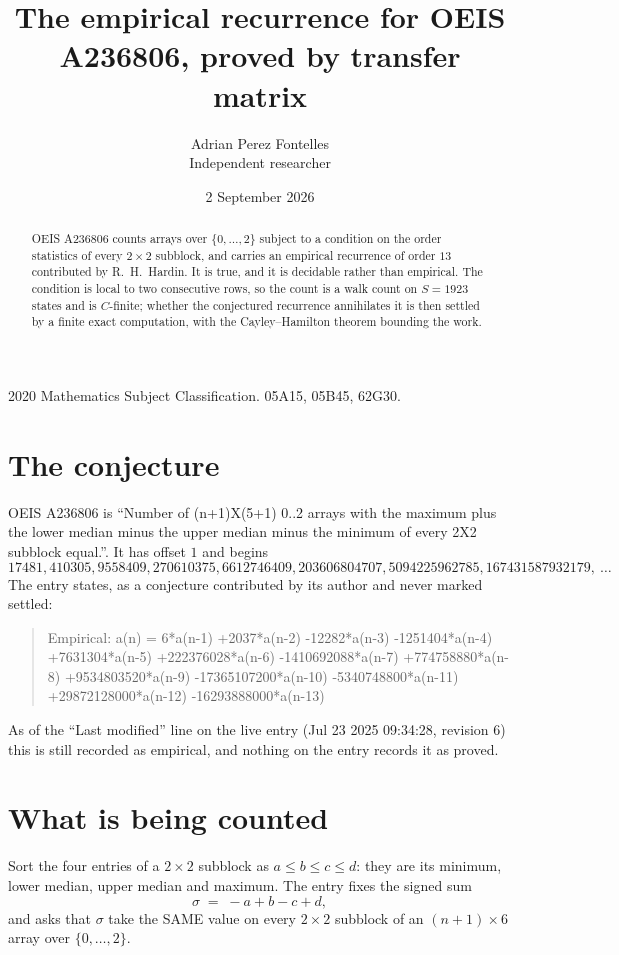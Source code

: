 \documentclass[11pt,a4paper]{article}
\title{The empirical recurrence for OEIS A236806, proved by transfer matrix}
\author{Adrian Perez Fontelles\\ \small Independent researcher}
\date{2 September 2026}
\theoremstyle{plain}
\theoremstyle{definition}
\begin{document}
\maketitle

\begin{abstract}
OEIS A236806 counts arrays over $\{0,\dots,2\}$ subject to a condition on the order
statistics of every $2\times2$ subblock, and carries an empirical recurrence of order
$13$ contributed by R.~H.~Hardin. It is true, and it is decidable rather than empirical.
The condition is local to two consecutive rows, so the count is a walk count on $S=1923$
states and is $C$-finite; whether the conjectured recurrence annihilates it is then settled by
a finite exact computation, with the Cayley--Hamilton theorem bounding the work.
\end{abstract}

\noindent\small 2020 Mathematics Subject Classification. 05A15, 05B45, 62G30.\normalsize

\section{The conjecture}

OEIS A236806 is ``Number of (n+1)X(5+1) 0..2 arrays with the maximum plus the lower median minus the upper median minus the minimum of every 2X2 subblock equal.''. It has offset $1$ and begins
\[
17481, 410305, 9558409, 270610375, 6612746409, 203606804707, 5094225962785, 167431587932179,\ \dots
\]
The entry states, as a conjecture contributed by its author and never marked settled:
\begin{quote}
Empirical: a(n) = 6*a(n-1) +2037*a(n-2) -12282*a(n-3) -1251404*a(n-4) +7631304*a(n-5) +222376028*a(n-6) -1410692088*a(n-7) +774758880*a(n-8) +9534803520*a(n-9) -17365107200*a(n-10) -5340748800*a(n-11) +29872128000*a(n-12) -16293888000*a(n-13)
\end{quote}
As of the ``Last modified'' line on the live entry (Jul 23 2025 09:34:28, revision 6) this is still
recorded as empirical, and nothing on the entry records it as proved.

\section{What is being counted}

Sort the four entries of a $2\times2$ subblock as $a\le b\le c\le d$: they
are its minimum, lower median, upper median and maximum. The entry fixes the signed sum
\[
\sigma\;=\;-a+b-c+d,
\]
and asks that $\sigma$ take the SAME value on every $2\times2$ subblock of an
$(n+1)\times6$ array over $\{0,\dots,2\}$.
\end{document}
